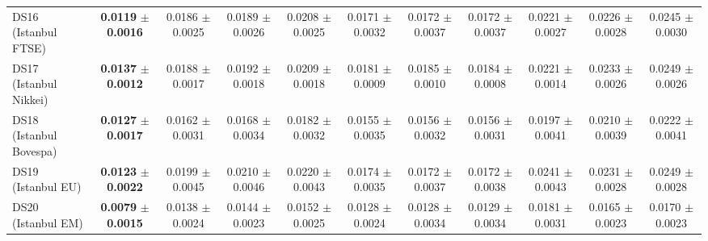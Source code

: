 \begin{table}[t]
{{\begin{tabular}{lcccccccccc}
DS16 (Istanbul FTSE) & \textbf{0.0119} $\pm$ \textbf{0.0016} & 0.0186 $\pm$ 0.0025 & 0.0189 $\pm$ 0.0026 & 0.0208 $\pm$ 0.0025 & 0.0171 $\pm$ 0.0032 & 0.0172 $\pm$ 0.0037 & 0.0172 $\pm$ 0.0037 & 0.0221 $\pm$ 0.0027 & 0.0226 $\pm$ 0.0028 & 0.0245 $\pm$ 0.0030 \\
DS17 (Istanbul Nikkei) & \textbf{0.0137} $\pm$ \textbf{0.0012} & 0.0188 $\pm$ 0.0017 & 0.0192 $\pm$ 0.0018 & 0.0209 $\pm$ 0.0018 & 0.0181 $\pm$ 0.0009 & 0.0185 $\pm$ 0.0010 & 0.0184 $\pm$ 0.0008 & 0.0221 $\pm$ 0.0014 & 0.0233 $\pm$ 0.0026 & 0.0249 $\pm$ 0.0026 \\
DS18 (Istanbul Bovespa) & \textbf{0.0127} $\pm$ \textbf{0.0017} & 0.0162 $\pm$ 0.0031 & 0.0168 $\pm$ 0.0034 & 0.0182 $\pm$ 0.0032 & 0.0155 $\pm$ 0.0035 & 0.0156 $\pm$ 0.0032 & 0.0156 $\pm$ 0.0031 & 0.0197 $\pm$ 0.0041 & 0.0210 $\pm$ 0.0039 & 0.0222 $\pm$ 0.0041 \\
DS19 (Istanbul EU) & \textbf{0.0123} $\pm$ \textbf{0.0022} & 0.0199 $\pm$ 0.0045 & 0.0210 $\pm$ 0.0046 & 0.0220 $\pm$ 0.0043 & 0.0174 $\pm$ 0.0035 & 0.0172 $\pm$ 0.0037 & 0.0172 $\pm$ 0.0038 & 0.0241 $\pm$ 0.0043 & 0.0231 $\pm$ 0.0028 & 0.0249 $\pm$ 0.0028 \\
DS20 (Istanbul EM) & \textbf{0.0079} $\pm$ \textbf{0.0015} & 0.0138 $\pm$ 0.0024 & 0.0144 $\pm$ 0.0023 & 0.0152 $\pm$ 0.0025 & 0.0128 $\pm$ 0.0024 & 0.0128 $\pm$ 0.0034 & 0.0129 $\pm$ 0.0034 & 0.0181 $\pm$ 0.0031 & 0.0165 $\pm$ 0.0023 & 0.0170 $\pm$ 0.0023 \\
\bottomrule
\end{tabular}%
}%
}
\end{table}
